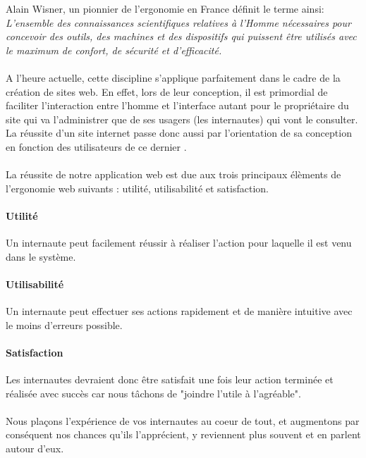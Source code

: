 Alain Wisner, un pionnier de l’ergonomie en France définit le terme ainsi:
\textit{L’ensemble des connaissances scientifiques relatives à l’Homme nécessaires pour 
concevoir des outils, des machines et des dispositifs qui puissent être utilisés avec 
le maximum de confort, de sécurité et d’efficacité.}
\paragraph{}
A l’heure actuelle, cette discipline s’applique parfaitement dans le cadre de la 
création de sites web. En effet, lors de leur conception, il est primordial de 
faciliter l’interaction entre l’homme et l’interface autant pour le propriétaire 
du site qui va l’administrer que de ses usagers (les internautes) qui vont le 
consulter. La réussite d’un site internet passe donc aussi par l’orientation 
de sa conception en fonction des utilisateurs de  ce dernier \cite{ergonomie}.  
\paragraph{}
La réussite de notre application web est due aux trois principaux élèments de l'ergonomie 
web suivants : utilité, utilisabilité et satisfaction.
\paragraph{Utilité}
Un internaute peut facilement réussir à réaliser l’action pour laquelle il est venu dans le système.
\paragraph{Utilisabilité}
Un internaute peut effectuer ses actions rapidement et de manière intuitive avec le moins 
d’erreurs possible. 
\paragraph{Satisfaction}
Les internautes devraient donc être satisfait une fois leur action terminée et réalisée avec succès 
car nous tâchons de "joindre l’utile à l’agréable". 
\paragraph{}
Nous plaçons l’expérience de vos internautes au coeur de tout, et augmentons par conséquent nos chances 
qu’ils l’apprécient, y reviennent plus souvent et en parlent autour d’eux.

